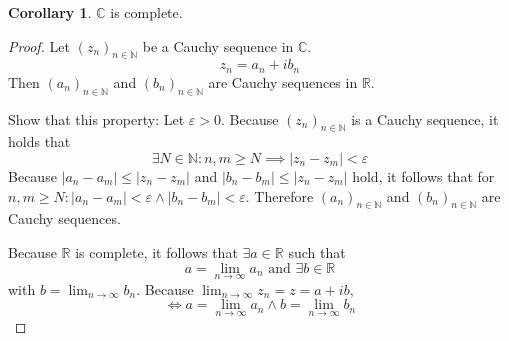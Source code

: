 \documentclass[a4paper,landscape,twocolumn]{article}
\theoremstyle{definition}
\newtheorem{cor}{Corollary}
\newcommand\abs[1]{\left|#1\right|}
\newcommand\seq[1]{{\left(#1\right)}_{n \in \mathbb N}}
\begin{document}
\begin{cor}
  $\mathbb C$ is complete.
\end{cor}
\begin{proof}
  Let $\seq{z_n}$ be a Cauchy sequence in $\mathbb C$.
  \[ z_n = a_n + i b_n \]
  Then $\seq{a_n}$ and $\seq{b_n}$ are Cauchy sequences in $\mathbb R$.

  Show that this property: Let $\varepsilon > 0$. Because $\seq{z_n}$ is a Cauchy sequence,
  it holds that
  \[ \exists N \in \mathbb N: n,m \geq N \implies \abs{z_n - z_m} < \varepsilon \]
  Because $\abs{a_n - a_m} \leq \abs{z_n - z_m}$ and $\abs{b_n - b_m} \leq \abs{z_n - z_m}$ hold,
  it follows that for $n,m \geq N: \abs{a_n - a_m} < \varepsilon \land \abs{b_n - b_m} < \varepsilon$.
  Therefore $\seq{a_n}$ and $\seq{b_n}$ are Cauchy sequences.

  Because $\mathbb R$ is complete, it follows that $\exists a \in \mathbb R$ such that
  \[ a = \lim_{n\to\infty} a_n \text{ and } \exists b \in \mathbb R \]
  with $b = \lim_{n\to\infty} b_n$. Because $\lim_{n\to\infty} z_n = z = a + ib$,
  \[ \iff a = \lim_{n\to\infty} a_n \land b = \lim_{n\to\infty} b_n \]
\end{proof}
\end{document}

